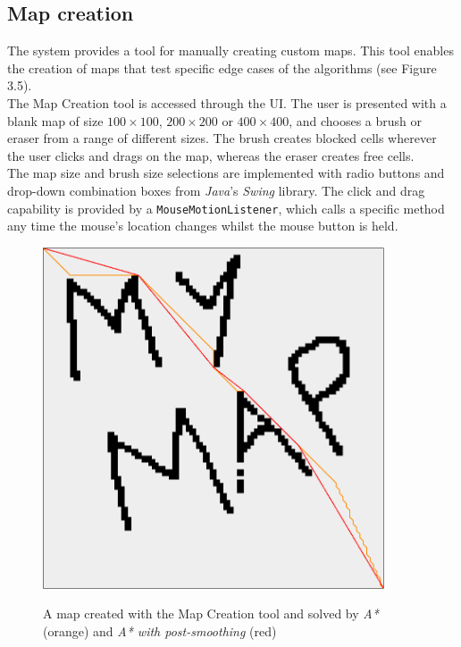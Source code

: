 \documentclass[12pt,notitlepage]{report}
\begin{document}
\subsection{Map creation}

The system provides a tool for manually creating custom maps. This tool enables the creation of maps that test specific edge cases of the algorithms (see Figure 3.5).\\

\noindent
The Map Creation tool is accessed through the UI. The user is presented with a blank map of size $100 \times 100$, $200 \times 200$ or $400 \times 400$, and chooses a brush or eraser from a range of different sizes. The brush creates blocked cells wherever the user clicks and drags on the map, whereas the eraser creates free cells.\\

\noindent
The map size and brush size selections are implemented with radio buttons and drop-down combination boxes from {\em Java}'s {\em Swing} library. The click and drag capability is provided by a {\tt MouseMotionListener}, which calls a specific method any time the mouse's location changes whilst the mouse button is held.

\begin{figure}
\centering
  {\includegraphics[width=0.9\textwidth]{creationmode.png}}
  \caption[A map created with the Map Creation tool]{A map created with the Map Creation tool and solved by {\em A*} (orange) and {\em A* with post-smoothing} (red)} 
\end{figure}
\end{document}
